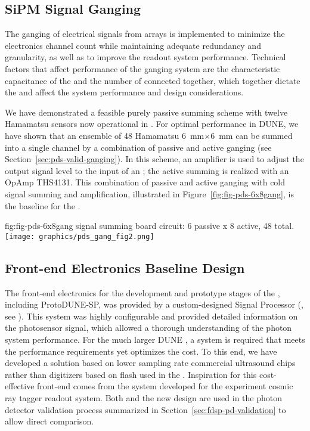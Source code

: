 \subsection{SiPM Signal Ganging}
\label{sec:pds-design-ganging}

The ganging of electrical signals from  arrays is implemented to minimize the electronics channel count while maintaining adequate redundancy and granularity, as well as to improve the readout system performance.  
Technical factors that affect performance of the ganging system are the characteristic capacitance of the  and the number of  connected together, which together dictate the  and affect the system performance and design considerations.

We have demonstrated a feasible purely passive summing scheme with twelve Hamamatsu  sensors now operational in . For optimal performance in DUNE, we have shown that an ensemble of 48 Hamamatsu \SI{6}{mm}$\times$\SI{6}{mm}  can be summed into a single channel by a combination of passive and active ganging (see Section~\ref{sec:pds-valid-ganging}).  In this scheme, an amplifier is used to adjust the  output signal level to the input of an ; the active summing is realized with an OpAmp THS4131. This combination of passive and active ganging with cold signal summing and amplification, illustrated in Figure~\ref{fig:fig-pds-6x8gang}, is the baseline for the .

\begin{dunefigure}
 {fig:fig-pds-6x8gang}
 { signal summing board circuit: 6 passive  x 8 active, 48  total.}
\texttt{[image: graphics/pds\_gang\_fig2.png]}
\end{dunefigure}


\subsection{Front-end Electronics Baseline Design}
\label{sec:electronics}

The front-end electronics for the development and prototype stages of the  , including ProtoDUNE-SP, was provided by a custom-designed  Signal Processor (, see ). This system was highly configurable and provided detailed information on the photosensor signal, which allowed a thorough understanding of the photon system performance.
For the much larger DUNE , a system is required that meets the performance requirements yet optimizes the cost.
To this end, we have developed a solution based on lower sampling rate commercial ultrasound  chips rather than digitizers based on flash  used in the . Inspiration for this cost-effective front-end comes from the system developed for the  experiment cosmic ray tagger readout system.
Both  and the new design are used in the photon detector validation process summarized in Section~\ref{sec:fdsp-pd-validation} to allow direct comparison.

